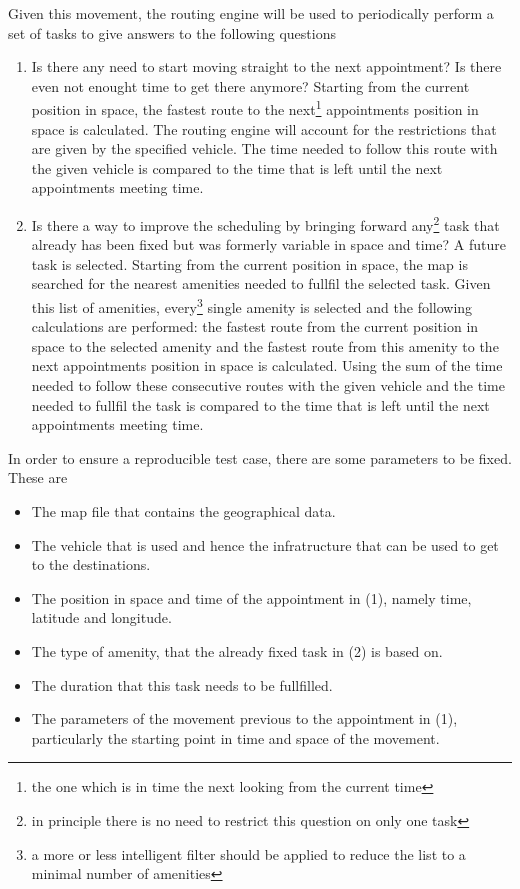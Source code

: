 Given this movement, the routing engine will be used to periodically perform a set of tasks to give answers to the following questions
\begin{enumerate}
	\item Is there any need to start moving straight to the next appointment? Is there even not enought time to get there anymore?\newline
	Starting from the current position in space, the fastest route to the next\footnote{the one which is in time the next looking from the current time} appointments position in space is calculated. The routing engine will account for the restrictions that are given by the specified vehicle. The time needed to follow this route with the given vehicle is compared to the time that is left until the next appointments meeting time.
	
	\item Is there a way to improve the scheduling by bringing forward any\footnote{in principle there is no need to restrict this question on only one task} task that already has been fixed but was formerly variable in space and time?\newline 
	A future task is selected. Starting from the current position in space, the map is searched for the nearest amenities needed to fullfil the selected task. Given this list of amenities, every\footnote{a more or less intelligent filter should be applied to reduce the list to a minimal number of amenities} single amenity is selected and the following calculations are performed: the fastest route from the current position in space to the selected amenity and the fastest route from this amenity to the next appointments position in space is calculated. Using the sum of the time needed to follow these consecutive routes with the given vehicle and the time needed to fullfil the task is compared to  the time that is left until the next appointments meeting time.
\end{enumerate}

In order to ensure a reproducible  test case, there are some parameters to be fixed. These are
\begin{itemize}
	\item The map file that contains the geographical data.
	\item The vehicle that is used and hence the infratructure that can be used to get to the destinations.
	\item The position in space and time of the appointment in (1), namely time, latitude and longitude.
	\item The type of amenity, that the already fixed task in (2) is based on.
	\item The duration that this task needs to be fullfilled.
	\item The parameters of the movement previous to the appointment in (1), particularly the starting point in time and space of the movement.
\end{itemize}
	
	
